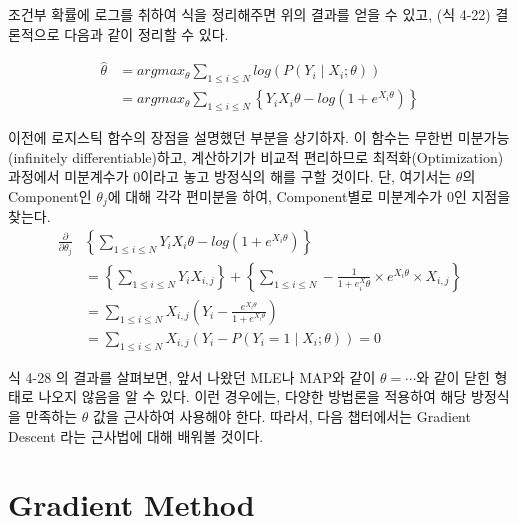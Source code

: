 \documentclass[a4paper]{oblivoir}
\begin{document}
\indent 조건부 확률에 로그를 취하여 식을 정리해주면 위의 결과를 얻을 수 있고, (식 4-22) 결론적으로 다음과 같이 정리할 수 있다.

\begin{align*}
\hat{\theta}	&=argmax_{\theta}\sum_{1\le i\le N}log(P(Y_{i} \mid X_{i};\theta)) \tag{4-23}\\
&=argmax_{\theta}\sum_{1\le i\le N}\left\{Y_{i}X_{i}\theta - log(1+e^{X_{i}\theta})\right\}	\tag{4-24}
\end{align*}

\indent 이전에 로지스틱 함수의 장점을 설명했던 부분을 상기하자. 이 함수는 무한번 미분가능(infinitely differentiable)하고, 계산하기가 비교적 편리하므로 최적화(Optimization) 과정에서 미분계수가 0이라고 놓고 방정식의 해를 구할 것이다. 단, 여기서는 $\theta$의 Component인 $\theta_{j}$에 대해 각각 편미분을 하여, Component별로 미분계수가 0인 지점을 찾는다.
\begin{align*}
\frac{\partial}{\partial \theta_{j}}&\left\{\sum_{1\le i\le N}Y_{i}X_{i}\theta - log(1+e^{X_{i}\theta})\right\} \tag{4-25}\\
&=\left\{\sum_{1\le i\le N}Y_{i}X_{i,j}\right\}+\left\{\sum_{1\le i\le N}-\frac{1}{1+e^X_{i}\theta}\times e^{X_{i}\theta}\times X_{i,j}\right\}								\tag{4-26}\\
&=\sum_{1\le i\le N}X_{i,j}\left(Y_{i}-\frac{e^{X_{i}\theta}}{1+e^{X_{i}\theta}} \right)	\tag{4-27}\\
&=\sum_{1\le i\le N}X_{i,j}(Y_{i}-P(Y_{i}=1 \mid X_{i};\theta)) =0					\tag{4-28}
\end{align*}

\indent 식 4-28 의 결과를 살펴보면, 앞서 나왔던 MLE나 MAP와 같이 $\theta = \cdots$와 같이 닫힌 형태로 나오지 않음을 알 수 있다. 이런 경우에는, 다양한 방법론을 적용하여 해당 방정식을 만족하는 $\theta$ 값을 근사하여 사용해야 한다. 따라서, 다음 챕터에서는 Gradient Descent 라는 근사법에 대해 배워볼 것이다.

\section{Gradient Method}

\end{document}

